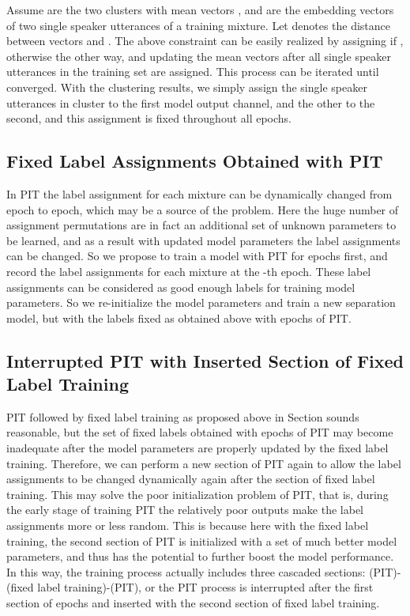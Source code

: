 \documentclass{article}
\begin{document}
Assume  are the two clusters with mean vectors , and  are the embedding vectors of two single speaker utterances  of a training mixture. Let  denotes the distance between vectors  and . The above constraint can be easily realized by assigning  if , otherwise the other way, and updating the mean vectors after all single speaker utterances in the training set are assigned. This process can be iterated until converged. With the clustering results, we simply assign the single speaker utterances in cluster  to the first model output channel, and the other to the second, and this assignment is fixed throughout all epochs.

\vspace{-7pt}
\subsection{Fixed Label Assignments Obtained with PIT}
\vspace{-7pt}
In PIT the label assignment for each mixture can be dynamically changed from epoch to epoch, which may be a source of the problem. Here the huge number of assignment permutations are in fact an additional set of unknown parameters to be learned, and as a result with updated model parameters the label assignments can be changed. So we propose to train a model with PIT for  epochs first, and record the label assignments for each mixture at the -th epoch. These label assignments can be considered as good enough labels for training model parameters. So we re-initialize the model parameters and train a new separation model, but with the labels fixed as obtained above with  epochs of PIT.
\vspace{-7pt}
\subsection{Interrupted PIT with Inserted Section of Fixed Label Training}
\vspace{-7pt}
PIT followed by fixed label training as proposed above in Section  sounds reasonable, but the set of fixed labels obtained with  epochs of PIT may become inadequate after the model parameters are properly updated by the fixed label training. Therefore, we can perform a new section of PIT again to allow the label assignments to be changed dynamically again after the section of fixed label training. This may solve the poor initialization problem of PIT, that is, during the early stage of training PIT the relatively poor outputs make the label assignments more or less random. This is because here with the fixed label training, the second section of PIT is initialized with a set of much better model parameters, and thus has the potential to further boost the model performance. In this way, the training process actually includes three cascaded sections: (PIT)-(fixed label training)-(PIT), or the PIT process is interrupted after the first section of  epochs and inserted with the second section of fixed label training.
\end{document}
